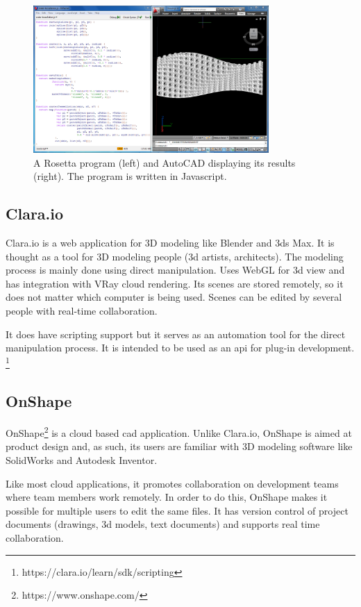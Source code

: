 \begin{figure}
	\centering
	\includegraphics[width=0.8\textwidth]{images/rosetta_js_autocad}
	\caption{A Rosetta program (left) and AutoCAD displaying its results (right). The program is written in Javascript.}
	\label{fig:rosetta:ex}
\end{figure}


\subsection{Clara.io}
Clara.io is a web application for 3D modeling like Blender and 3ds Max.
It is thought as a tool for 3D modeling people (3d artists, architects).
The modeling process is mainly done using direct manipulation.
Uses WebGL for 3d view and has integration with VRay cloud rendering.
Its scenes are stored remotely, so it does not matter which computer is being used.
Scenes can be edited by several people with real-time collaboration.

It does have scripting support but it serves as an automation tool for the direct manipulation process.
It is intended to be used as an \gls{api} for plug-in development.%
\footnote{https://clara.io/learn/sdk/scripting}


\subsection{OnShape}
OnShape\footnote{https://www.onshape.com/} is a cloud based \gls{cad} application.
Unlike Clara.io, OnShape is aimed at product design and, as such, its users are familiar with 3D modeling software like SolidWorks and Autodesk Inventor.

Like most cloud applications, it promotes collaboration on development teams where team members work remotely.
In order to do this, OnShape makes it possible for multiple users to edit the same files.
It has version control of project documents (drawings, 3d models, text documents) and supports real time collaboration.

